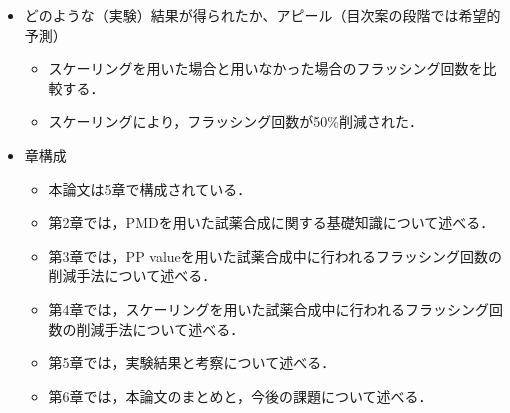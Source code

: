 \begin{itemize}
\begin{itemize}
    \end{itemize}
 \item どのような（実験）結果が得られたか、アピール（目次案の段階では希望的予測）
    \begin{itemize}
        \item スケーリングを用いた場合と用いなかった場合のフラッシング回数を比較する．
        \item スケーリングにより，フラッシング回数が50\%削減された．
    \end{itemize}
\item 章構成
    \begin{itemize}
        \item 本論文は5章で構成されている．
        \item 第2章では，PMDを用いた試薬合成に関する基礎知識について述べる．
        \item 第3章では，PP valueを用いた試薬合成中に行われるフラッシング回数の削減手法について述べる．
        \item 第4章では，スケーリングを用いた試薬合成中に行われるフラッシング回数の削減手法について述べる．
        \item 第5章では，実験結果と考察について述べる．
        \item 第6章では，本論文のまとめと，今後の課題について述べる．
    \end{itemize}
\end{itemize}

